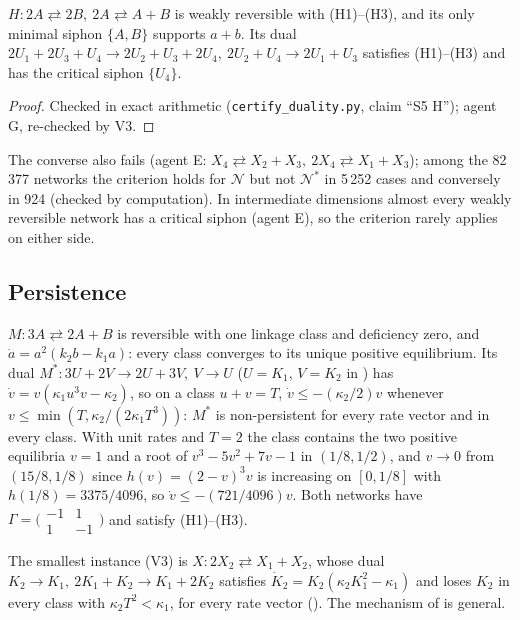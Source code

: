 \documentclass[11pt,a4paper]{report}
\newcommand{\Net}{\mathcal{N}}
\newcommand{\Nd}{\mathcal{N}^{*}}
\begin{document}
\begin{proposition}\label{prop:ADLS}
\(H\colon 2A\rightleftarrows2B,\ 2A\rightleftarrows A+B\) is weakly reversible with (H1)--(H3), and its only minimal
siphon \(\{A,B\}\) supports \(a+b\). Its dual \(2U_1+2U_3+U_4\to2U_2+U_3+2U_4,\ 2U_2+U_4\to2U_1+U_3\) satisfies
(H1)--(H3) and has the critical siphon \(\{U_4\}\).
\end{proposition}
\begin{proof}
Checked in exact arithmetic (\texttt{certify\_duality.py}, claim ``S5 H''); agent G, re-checked by V3.
\end{proof}

The converse also fails (agent E: \(X_4\rightleftarrows X_2+X_3,\ 2X_4\rightleftarrows X_1+X_3\)); among the 82\,377
networks the criterion holds for \(\Net\) but not \(\Nd\) in 5\,252 cases and conversely in 924 (checked by
computation). In intermediate dimensions almost every weakly reversible network has a critical siphon (agent E), so
the criterion rarely applies on either side.

\subsection{Persistence}

\begin{example}\label{ex:M}
\(M\colon 3A\rightleftarrows2A+B\) is reversible with one linkage class and deficiency zero, and
\(\dot a=a^2(k_2b-k_1a)\): every class converges to its unique positive equilibrium. Its dual
\(M^*\colon 3U+2V\to2U+3V,\ V\to U\) (\(U=K_1\), \(V=K_2\) in ) has \(\dot v=v(\kappa_1u^3v-\kappa_2)\), so on a class \(u+v=T\),
\(\dot v\le-(\kappa_2/2)v\) whenever \(v\le\min(T,\kappa_2/(2\kappa_1T^3))\): \(M^*\) is non-persistent for every rate
vector and in every class. With unit rates and \(T=2\) the class contains the two positive equilibria \(v=1\) and a root
of \(v^3-5v^2+7v-1\) in \((1/8,1/2)\), and \(v\to0\) from \((15/8,1/8)\) since \(h(v)=(2-v)^3v\) is increasing on
\([0,1/8]\) with \(h(1/8)=3375/4096\), so \(\dot v\le-(721/4096)v\). Both networks have \(\Gamma=\bigl(\begin{smallmatrix}-1&1\\1&-1\end{smallmatrix}\bigr)\)
and satisfy (H1)--(H3).
\end{example}

The smallest instance (V3) is \(X\colon 2X_2\rightleftarrows X_1+X_2\), whose dual \(K_2\to K_1,\ 2K_1+K_2\to
K_1+2K_2\) satisfies \(\dot K_2=K_2(\kappa_2K_1^2-\kappa_1)\) and loses \(K_2\) in every class with \(\kappa_2T^2<\kappa_1\),
for every rate vector (). The mechanism of  is general.
\end{document}
